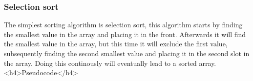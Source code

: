\subsubsection{Selection sort}
The simplest sorting algorithm is selection sort, this algorithm starts by finding
the smallest value in the array and placing it in the front. Afterwards it will find the
smallest value in the array, but this time it will exclude the first value, subsequently 
finding the second smallest value and placing it in the second slot in the array. 
Doing this continously will eventually lead to a sorted array. 
<h4>Pseudocode</h4>

